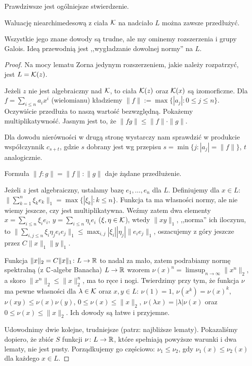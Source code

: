 Prawdziwsze jest ogólniejsze stwierdzenie.

\begin{twierdzenie}[Krull]
	Waluację niearchimedesową z ciała $\mathcal K$ na nadciało $L$ można zawsze przedłużyć.
\end{twierdzenie}

Wszystkie jego znane dowody są trudne, ale my ominemy rozszerzenia i grupy Galois.
Ideą przewodnią jest ,,wygładzanie dowolnej normy'' na $L$.

\begin{proof}
	Na mocy lematu Zorna jedynym rozszerzeniem, jakie należy rozpatrzyć, jest $L = \mathcal K(z)$.

	Jeżeli $z$ nie jest algebraiczny nad $\mathcal K$, to ciała $\mathcal K(z)$ oraz $\mathcal K(x)$ są izomorficzne.
	Dla $f = \sum_{i\le n} a_i x^i$ (wielomianu) kładziemy $\|f\| := \max \{|a_j| \colon 0 \le j \le n\}$.
	Oczywiście przedłuża to naszą wartość bezwzględną.
	Pokażemy multiplikatywność.
	Jasnym jest to, że $\|fg\| \le \|f\| \cdot \|g\|$.

	Dla dowodu nierówności w drugą stronę wystarczy nam sprawdzić w produkcie współczynnik $c_{s+t}$, gdzie $s$ dobrany jest wg przepisu $s = \min \{j : |a_j| = \|f\|\}$, $t$ analogicznie.

	Formuła $\|f:g\| = \|f\|:\|g\|$ daje żądane przedłużenie.

	Jeżeli $z$ jest algebraiczny, ustalamy bazę $e_1, \ldots, e_n$ dla $L$.
	Definiujemy dla $x \in L$: $\| \sum_{k=1}^n \xi_k e_k \|_1 = \max \{|\xi_k| : k \le n\}$.
	Funkcja ta ma własności normy, ale nie wiemy jeszcze, czy jest multiplikatywna.
	Weźmy zatem dwa elementy $x = \sum_{i \le n} \xi_i e_i$, $y = \sum_{i \le n} \eta_i e_i$ ($\xi, \eta \in \mathcal K$), wtedy $\|xy\|_1$, ,,norma'' ich iloczynu, to $\|\sum_{i, j \le n} \xi_i \eta_j e_i e_j \|_1 \le \max_{i, j} |\xi_i| |\eta_j| \|e_ie_j\|_1$, oszacujemy z góry jeszcze przez $C \|x\|_1 \|y\|_1.$

	Funkcja $\|x\|_2 = C \|x\|_1 \colon L \to \mathbb R$ to nadal za mało, zatem podrabiamy normę spektralną (z $\mathbb C$-algebr Banacha) $L \to \mathbb R$ wzorem $\nu(x)^n = \limsup_{n \to \infty}\|x^n\|_2$, a skoro $\|x^n\|_2 \le \|x\|_2^n$, ma to ręce i nogi. Twierdzimy przy tym, że funkcja $\nu$ ma pewne własności dla $\lambda \in \mathcal K$ oraz $x, y \in L$: $\nu(1) = 1$, $\nu(x^k) = \nu(x)^k$, $\nu(xy) \le \nu(x) \nu(y)$, $0 \le \nu(x) \le \|x\|_2$, $\nu(\lambda x) = |\lambda| \nu(x)$ oraz $0 \le \nu(x) \le \|x\|_2$.
	Ich dowody są łatwe i przyjemne.

	Udowodnimy dwie kolejne, trudniejsze (patrz: najbliższe lematy).
	Pokazaliśmy dopiero, że zbiór $S$ funkcji $\nu \colon L \to \mathbb R$, które spełniają powyższe warunki i dwa lematy, nie jest pusty.
	Porządkujemy go częściowo: $\nu_1 \le \nu_2$, gdy $\nu_1(x) \le \nu_2(x)$ dla każdego $x \in L$.
	

\end{proof}
